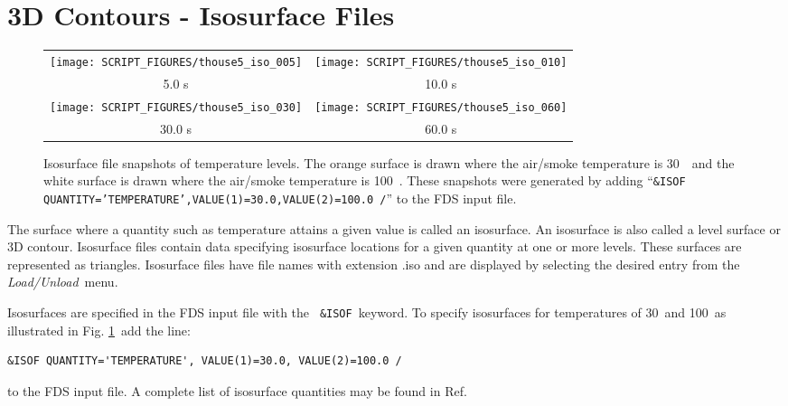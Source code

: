 \documentclass[11pt,twoside]{book}
\newcommand{\figheightA}{2.5in}
\begin{document}
\section{3D Contours - Isosurface Files}
\label{section:isosurface}
\begin{figure}[bph]
\begin{center}
\begin{tabular}{cc}
\texttt{[image: SCRIPT\_FIGURES/thouse5\_iso\_005]}&
\texttt{[image: SCRIPT\_FIGURES/thouse5\_iso\_010]}\\
5.0 s&10.0 s\\
\texttt{[image: SCRIPT\_FIGURES/thouse5\_iso\_030]}&
\texttt{[image: SCRIPT\_FIGURES/thouse5\_iso\_060]}\\
30.0 s&60.0 s
\end{tabular}
\end{center}
\caption [Isosurface file snapshots of temperature levels. ]

{ Isosurface file snapshots of temperature levels. The orange
surface is drawn where the air/smoke temperature is 30~\degC\ and
the white surface is drawn where the air/smoke temperature is
100~\degC. These snapshots were generated by adding ``{\tt\&ISOF
QUANTITY='TEMPERATURE',VALUE(1)=30.0,VALUE(2)=100.0 /}'' to the
FDS input file.}
\label{figiso}%
\end{figure}

The surface where a quantity such as temperature attains a given
value is called an isosurface. An isosurface is also called a
level surface or 3D contour. Isosurface files contain data
specifying isosurface locations for a given quantity at one or
more levels. These surfaces are represented as triangles.
Isosurface files have file names with extension .iso and are
displayed by selecting the desired entry from the {\em
Load/Unload}\ menu.

Isosurfaces are specified in the FDS input file with the {\tt
\&ISOF}\ keyword.  To specify isosurfaces for temperatures of
30\degC\ and 100\degC\ as illustrated in Fig. \ref{figiso}\ add
the line:
\begin{lstlisting}
&ISOF QUANTITY='TEMPERATURE', VALUE(1)=30.0, VALUE(2)=100.0 /
\end{lstlisting}
to the FDS input file.  A complete list of isosurface quantities
may be found in Ref.~\cite{FDS_Users_Guide}
\end{document}
